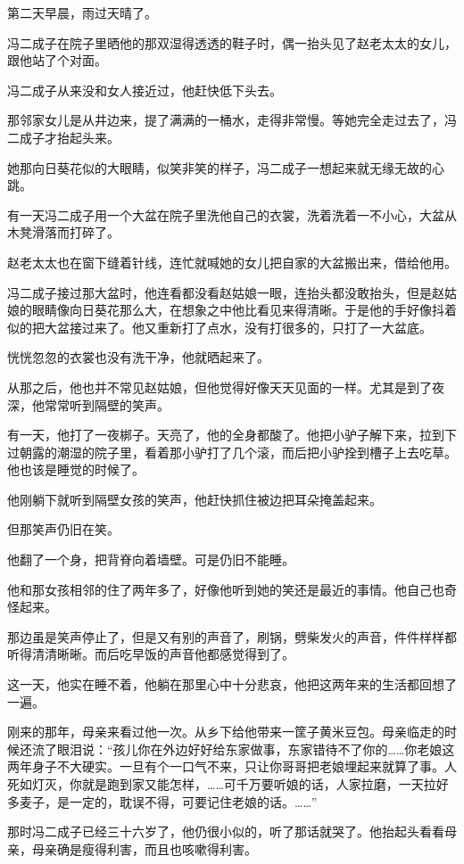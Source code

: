 \par 第二天早晨，雨过天晴了。
\par 冯二成子在院子里晒他的那双湿得透透的鞋子时，偶一抬头见了赵老太太的女儿，跟他站了个对面。
\par 冯二成子从来没和女人接近过，他赶快低下头去。
\par 那邻家女儿是从井边来，提了满满的一桶水，走得非常慢。等她完全走过去了，冯二成子才抬起头来。
\par 她那向日葵花似的大眼睛，似笑非笑的样子，冯二成子一想起来就无缘无故的心跳。
\par 有一天冯二成子用一个大盆在院子里洗他自己的衣裳，洗着洗着一不小心，大盆从木凳滑落而打碎了。
\par 赵老太太也在窗下缝着针线，连忙就喊她的女儿把自家的大盆搬出来，借给他用。
\par 冯二成子接过那大盆时，他连看都没看赵姑娘一眼，连抬头都没敢抬头，但是赵姑娘的眼睛像向日葵花那么大，在想象之中他比看见来得清晰。于是他的手好像抖着似的把大盆接过来了。他又重新打了点水，没有打很多的，只打了一大盆底。
\par 恍恍忽忽的衣裳也没有洗干净，他就晒起来了。
\par 从那之后，他也并不常见赵姑娘，但他觉得好像天天见面的一样。尤其是到了夜深，他常常听到隔壁的笑声。
\par 有一天，他打了一夜梆子。天亮了，他的全身都酸了。他把小驴子解下来，拉到下过朝露的潮湿的院子里，看着那小驴打了几个滚，而后把小驴拴到槽子上去吃草。他也该是睡觉的时候了。
\par 他刚躺下就听到隔壁女孩的笑声，他赶快抓住被边把耳朵掩盖起来。
\par 但那笑声仍旧在笑。
\par 他翻了一个身，把背脊向着墙壁。可是仍旧不能睡。
\par 他和那女孩相邻的住了两年多了，好像他听到她的笑还是最近的事情。他自己也奇怪起来。
\par 那边虽是笑声停止了，但是又有别的声音了，刷锅，劈柴发火的声音，件件样样都听得清清晰晰。而后吃早饭的声音他都感觉得到了。
\par 这一天，他实在睡不着，他躺在那里心中十分悲哀，他把这两年来的生活都回想了一遍。
\par 刚来的那年，母亲来看过他一次。从乡下给他带来一筐子黄米豆包。母亲临走的时候还流了眼泪说：“孩儿你在外边好好给东家做事，东家错待不了你的……你老娘这两年身子不大硬实。一旦有个一口气不来，只让你哥哥把老娘埋起来就算了事。人死如灯灭，你就是跑到家又能怎样，……可千万要听娘的话，人家拉磨，一天拉好多麦子，是一定的，耽误不得，可要记住老娘的话。……”
\par 那时冯二成子已经三十六岁了，他仍很小似的，听了那话就哭了。他抬起头看看母亲，母亲确是瘦得利害，而且也咳嗽得利害。
